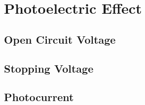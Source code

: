 \chapter{Photoelectric Effect}


\section{Open Circuit Voltage}%


\section{Stopping Voltage}%


\section{Photocurrent}%

